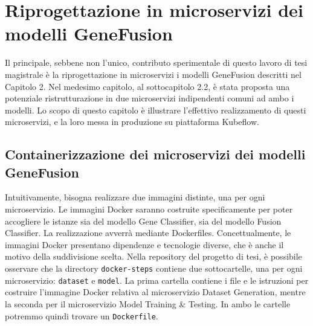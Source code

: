% 
% 
% 



\clearpage
\cleardoublepage

\chapter{Riprogettazione in microservizi dei modelli GeneFusion}

Il principale, sebbene non l'unico, contributo sperimentale di questo lavoro di tesi magistrale è la riprogettazione in microservizi i modelli GeneFusion descritti nel Capitolo 2. Nel medesimo capitolo, al sottocapitolo 2.2, è stata proposta una potenziale ristrutturazione in due microservizi indipendenti comuni ad ambo i modelli. Lo scopo di questo capitolo è illustrare l'effettivo realizzamento di questi microservizi, e la loro messa in produzione su piattaforma Kubeflow.

\section{Containerizzazione dei microservizi dei modelli GeneFusion}

Intuitivamente, bisogna realizzare due immagini  distinte, una per ogni microservizio. Le immagini Docker saranno costruite specificamente per poter accogliere le istanze sia del modello Gene Classifier, sia del modello Fusion Classifier. La realizzazione avverrà mediante Dockerfiles. Concettualmente, le immagini Docker presentano dipendenze e tecnologie diverse, che è anche il motivo della suddivisione scelta. Nella repository del progetto di tesi, è possibile osservare che la directory {\small \verb|docker-steps|} contiene due sottocartelle, una per ogni microservizio: {\small \verb|dataset|} e {\small \verb|model|}. La prima cartella contiene i file e le istruzioni per costruire l'immagine Docker relativa al microservizio Dataset Generation, mentre la seconda per il microservizio Model Training \& Testing. In ambo le cartelle potremmo quindi trovare un {\small \verb|Dockerfile|}.

